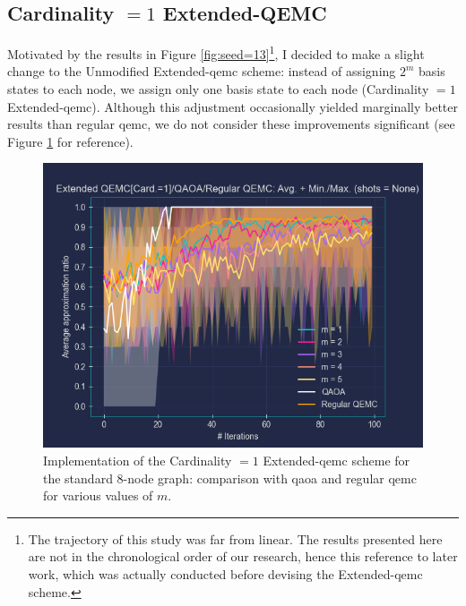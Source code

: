 \protect\subsection{Cardinality \texorpdfstring{$= 1$}{= 1} Extended-QEMC}
\label{subsection:Card._eq_1_Extended_QEMC}

Motivated by the results in Figure \ref{fig:seed=13}\footnote{The trajectory of this study was far from linear. The results presented here are not in the chronological order of our research, hence this reference to later work, which was actually conducted before devising the Extended-\acrshort{qemc} scheme.}, I decided to make a slight change to the Unmodified Extended-\acrshort{qemc} scheme: instead of assigning $2^m$ basis states to each node, we assign only one basis state to each node (Cardinality $= 1$ Extended-\acrshort{qemc}). Although this adjustment occasionally yielded marginally better results than regular \acrshort{qemc}, we do not consider these improvements significant (see Figure \ref{fig:Card.=1_Extended-QEMC} for reference).
\begin{figure}[h]
    \centering
    \includegraphics[width=1\textwidth]{Figures/Chapter_5/Extended-QEMC/8-node[Card.=1](n_layers=3, step_size=0.95, m=All).png}
    \caption{Implementation of the Cardinality $= 1$ Extended-\acrshort{qemc} scheme for the standard $8$-node graph: comparison with \acrshort{qaoa} and regular \acrshort{qemc} for various values of $m$.}
    \label{fig:Card.=1_Extended-QEMC}
\end{figure}

